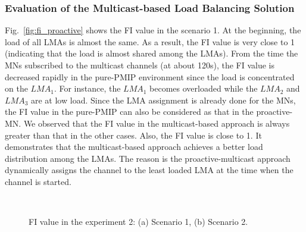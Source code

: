 \subsubsection{Evaluation of the Multicast-based Load Balancing Solution}
Fig.~\ref{fig:fi_proactive} shows the FI value in the scenario 1. At the beginning, the load of all LMAs is almost the same. As a result, the FI value is very close to 1 (indicating that the load is almost shared among the LMAs). From the time the MNs subscribed to the multicast channels (at about 120s), the FI value is decreased rapidly in the pure-PMIP environment since the load is concentrated on the $LMA_{1}$. For instance, the $LMA_{1}$ becomes overloaded while the $LMA_{2}$ and $LMA_{3}$ are at low load. Since the LMA assignment is already done for the MNs, the FI value in the pure-PMIP can also be considered as that in the proactive-MN. We observed that the FI value in the multicast-based approach is always greater than that in the other cases. Also, the FI value is close to 1. It demonstrates that the multicast-based approach achieves a better load distribution among the LMAs. The reason is the proactive-multicast approach dynamically assigns the channel to the least loaded LMA at the time when the channel is started. 
\begin{figure}[h!]
\centering
{}\,
\caption[Fairness Index for the multicast-based load balancing mechanisms.]{FI value in the experiment 2: (a) Scenario 1, (b) Scenario 2.}
\label{fig:scenario1}
\end{figure}

